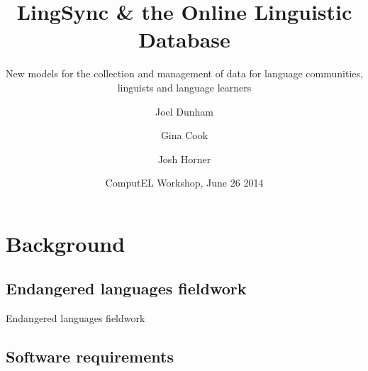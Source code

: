 \documentclass{beamer}
\begin{document}
\title[LingSync \& OLD] %
{LingSync \& the Online Linguistic Database}



\author[~]{Joel Dunham  \and Gina Cook  \and Josh Horner }
                 

\subtitle
{New models for the collection and management of data for language communities, linguists and
language learners}



\date[ComputEL 2014] %
{ComputEL Workshop, June 26 2014}





\begin{frame}
  \titlepage
\end{frame}

\section{Background}

\subsection[Fieldwork]{Endangered languages fieldwork}\label{sec:fieldwork}

\begin{frame}
Endangered languages fieldwork
\end{frame}

\subsection{Software requirements}
\end{document}

